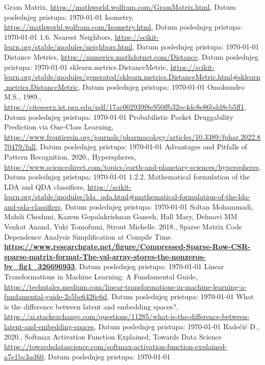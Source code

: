 \documentclass[fontsize=12bp, paper=a4]{scrarticle}
\begin{document}
\begin{thebibliography}{1}
    Gram Matrix, \url{https://mathworld.wolfram.com/GramMatrix.html}, Datum poslednjeg pristupa: \today
    Isometry, \url{https://mathworld.wolfram.com/Isometry.html}, Datum poslednjeg pristupa: \today
    1.6. Nearest Neighbors, \url{https://scikit-learn.org/stable/modules/neighbors.html}, Datum poslednjeg pristupa: \today
    Distance Metrics, \url{https://numerics.mathdotnet.com/Distance}, Datum poslednjeg pristupa: \today
    sklearn.metrics.DistanceMetric, \url{https://scikit-learn.org/stable/modules/generated/sklearn.metrics.DistanceMetric.html#sklearn.metrics.DistanceMetric}, Datum poslednjeg pristupa: \today
    Omohundro M.S., 1989., 
    \url{https://citeseerx.ist.psu.edu/pdf/17ac002939f8e950ffb32ec4dc8e86bdd8cb5ff1}, Datum poslednjeg pristupa: \today
    Probabilistic Pocket Druggability Prediction via One-Class Learning, \url{https://www.frontiersin.org/journals/pharmacology/articles/10.3389/fphar.2022.870479/full}, Datum poslednjeg pristupa: \today
    Advantages and Pitfalls of Pattern Recognition, 2020., Hyperspheres, \url{https://www.sciencedirect.com/topics/earth-and-planetary-sciences/hyperspheres}, Datum poslednjeg pristupa: \today
    1.2.2. Mathematical formulation of the LDA and QDA classifiers, \url{https://scikit-learn.org/stable/modules/lda_qda.html#mathematical-formulation-of-the-lda-and-qda-classifiers}, Datum poslednjeg pristupa: \today
    Soltan Mohammadi, Mahdi Cheshmi, Kazem Gopalakrishnan Ganesh, Hall Mary, Dehnavi MM Venkat Anand, Yuki Tomofumi, Strout Michelle. 2018., Sparse Matrix Code Dependence Analysis Simplification at Compile Time.  \textbf{\url{https://www.researchgate.net/figure/Compressed-Sparse-Row-CSR-sparse-matrix-format-The-val-array-stores-the-nonzeros-by_fig1_326696933}}, Datum poslednjeg pristupa: \today
    Linear Transformations in Machine Learning: A Fundamental Guide, \url{https://techntales.medium.com/linear-transformations-in-machine-learning-a-fundamental-guide-2e5be6426c6d}, Datum poslednjeg pristupa: \today
    What is the difference between latent and embedding spaces?,
\url{https://ai.stackexchange.com/questions/11285/what-is-the-difference-between-latent-and-embedding-spaces}, Datum poslednjeg pristupa: \today
    Radečić D., 2020., Softmax Activation Function Explained, Towards Data Science
    \url{https://towardsdatascience.com/softmax-activation-function-explained-a7e1bc3ad60}, Datum poslednjeg pristupa: \today

\end{thebibliography}
\end{document}
